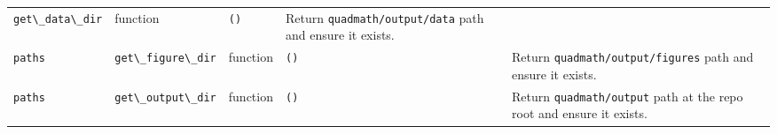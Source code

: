 \documentclass[
  10pt,
]{article}
\newcommand{\passthrough}[1]{#1}
\begin{document}
\begin{longtable}[]{@{}lllll@{}}
\begin{minipage}[t]{0.17\columnwidth}
\passthrough{\lstinline!get\_data\_dir!}\strut
\end{minipage} & \begin{minipage}[t]{0.17\columnwidth}\raggedright
function\strut
\end{minipage} & \begin{minipage}[t]{0.17\columnwidth}\raggedright
\passthrough{\lstinline!()!}\strut
\end{minipage} & \begin{minipage}[t]{0.17\columnwidth}\raggedright
Return \passthrough{\lstinline!quadmath/output/data!} path and ensure it
exists.\strut
\end{minipage}\tabularnewline
\begin{minipage}[t]{0.17\columnwidth}\raggedright
\passthrough{\lstinline!paths!}\strut
\end{minipage} & \begin{minipage}[t]{0.17\columnwidth}\raggedright
\passthrough{\lstinline!get\_figure\_dir!}\strut
\end{minipage} & \begin{minipage}[t]{0.17\columnwidth}\raggedright
function\strut
\end{minipage} & \begin{minipage}[t]{0.17\columnwidth}\raggedright
\passthrough{\lstinline!()!}\strut
\end{minipage} & \begin{minipage}[t]{0.17\columnwidth}\raggedright
Return \passthrough{\lstinline!quadmath/output/figures!} path and ensure
it exists.\strut
\end{minipage}\tabularnewline
\begin{minipage}[t]{0.17\columnwidth}\raggedright
\passthrough{\lstinline!paths!}\strut
\end{minipage} & \begin{minipage}[t]{0.17\columnwidth}\raggedright
\passthrough{\lstinline!get\_output\_dir!}\strut
\end{minipage} & \begin{minipage}[t]{0.17\columnwidth}\raggedright
function\strut
\end{minipage} & \begin{minipage}[t]{0.17\columnwidth}\raggedright
\passthrough{\lstinline!()!}\strut
\end{minipage} & \begin{minipage}[t]{0.17\columnwidth}\raggedright
Return \passthrough{\lstinline!quadmath/output!} path at the repo root
and ensure it exists.\strut
\end{minipage}\tabularnewline

\end{longtable}
\end{document}
